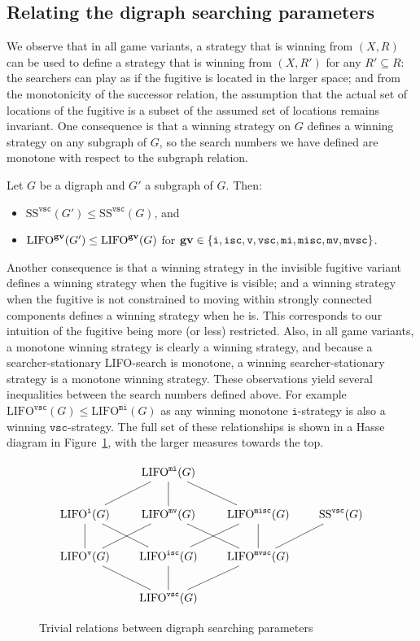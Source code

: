 \documentclass{llncs}
\newcommand{\lifo}[1]{\textrm{LIFO}^{#1}}
\newcommand{\sstat}[1]{\textrm{SS}^{#1}}
\newcommand{\var}{\texttt{\bf gv}}
\newcommand{\ivar}{\texttt{i}}
\newcommand{\vvar}{\texttt{v}}
\newcommand{\iscvar}{\texttt{isc}}
\newcommand{\vscvar}{\texttt{vsc}}
\newcommand{\mvar}{\texttt{m}}
\begin{document}
\subsection{Relating the digraph searching parameters}
We observe that in all game variants, a strategy that is winning from $(X,R)$ can be used to define a strategy that is winning from $(X,R')$ for any $R' \subseteq R$: the searchers can play as if the fugitive is located in the larger space; and from the monotonicity of the successor relation, the assumption that the actual set of locations of the fugitive is a subset of the assumed set of locations remains invariant.  
One consequence is that a winning strategy on $G$ defines a winning strategy on any subgraph of $G$, so the search numbers we have defined are monotone with respect to the subgraph relation.

\begin{proposition}\label{prop:subgraph}
Let $G$ be a digraph and $G'$ a subgraph of $G$.  Then:
\begin{itemize}\item $\sstat{\vscvar}(G')\leq \sstat{\vscvar}(G)$, and
\item $\lifo{\var}(G') \leq \lifo{\var}(G)$ for $\var \in \{\ivar,\iscvar, \vvar, \vscvar, \mvar\ivar,\mvar\iscvar, \mvar\vvar, \mvar\vscvar\}$.
\end{itemize}
\end{proposition}

Another consequence is that a winning strategy in the invisible fugitive variant defines a winning strategy when the fugitive is visible; and a winning strategy when the fugitive is not constrained to moving within strongly connected components defines a winning strategy when he is.  This corresponds to our intuition of the fugitive being more (or less) restricted.  Also, in all game variants, a monotone winning strategy is clearly a winning strategy, and because a searcher-stationary LIFO-search is monotone, a winning searcher-stationary strategy is a monotone winning strategy.  These observations yield several inequalities between the search numbers defined above.  For example $\lifo{\vscvar}(G) \leq \lifo{\mvar\ivar}(G)$ as any winning monotone $\ivar$-strategy is also a winning $\vscvar$-strategy.  The full set of these relationships is shown in a Hasse diagram in Figure~\ref{fig:rel}, with the larger measures towards the top.

\begin{figure}
\[\xymatrix@R=20pt@C=20pt{
&\lifo{\mvar\ivar}(G)\ar@{-}[dl]\ar@{-}[d]\ar@{-}[dr]\\
\lifo{\ivar}(G)\ar@{-}[d]\ar@{-}[dr]&\lifo{\mvar\vvar}(G)\ar@{-}[dl]\ar@{-}[dr]&\lifo{\mvar\iscvar}(G)\ar@{-}[d]\ar@{-}[dl]&\sstat{\vscvar}(G)\ar@{-}[dl]\\
\lifo{\vvar}(G)\ar@{-}[dr]&\lifo{\iscvar}(G)\ar@{-}[d]&\lifo{\mvar\vscvar}(G)\ar@{-}[dl]\\
&\lifo{\vscvar}(G)
 }\]
\caption{Trivial relations between digraph searching parameters}\label{fig:rel}
\end{figure}
\end{document}
